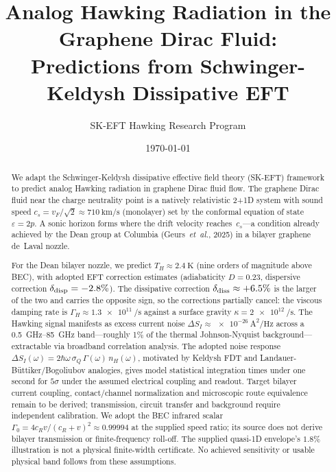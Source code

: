 \documentclass[aps,prd,twocolumn,showpacs,superscriptaddress,nofootinbib]{revtex4-2}
\begin{document}
\title{Analog Hawking Radiation in the Graphene Dirac Fluid:\\
Predictions from Schwinger-Keldysh Dissipative EFT}

\author{SK-EFT Hawking Research Program}

\date{\today}

\begin{abstract}
We adapt the Schwinger-Keldysh dissipative effective field theory (SK-EFT)
framework to predict analog Hawking radiation in graphene Dirac fluid flow.
The graphene Dirac fluid near the charge neutrality point is a natively
relativistic 2+1D system with sound speed $c_s = v_F/\sqrt{2} \approx
\SI{710}{\kilo\meter/\second}$ (monolayer) set by the conformal equation
of state $\varepsilon = 2p$. A sonic horizon forms where the drift velocity
reaches~$c_s$---a condition already achieved by the Dean group at Columbia
(Geurs~\textit{et~al.}, 2025) in a bilayer graphene de~Laval nozzle.

For the Dean bilayer nozzle, we predict $T_H \approx \SI{2.4}{\kelvin}$
(nine orders of magnitude above BEC), with adopted EFT correction estimates
(adiabaticity $D = 0.23$, dispersive correction $\delta_{\rm disp} = -2.8\%$).
The dissipative correction $\delta_{\rm diss} \approx +6.5\%$ is the larger
of the two and carries the opposite sign, so the corrections partially
cancel: the viscous damping rate is
$\Gamma_H \approx \SI{1.3e11}{\per\second}$ against a surface gravity
$\kappa = \SI{2e12}{\per\second}$. The Hawking
signal manifests as excess current noise $\Delta S_I \approx
\SI{e-26}{\ampere\squared/\hertz}$ across a \SIrange{0.5}{85}{\giga\hertz}
band---roughly 1\% of the thermal Johnson-Nyquist background---extractable
via broadband correlation analysis. The adopted noise response
$\Delta S_I(\omega) = 2\hbar\omega\,\sigma_Q\,\Gamma(\omega)\,n_H(\omega)$,
motivated by Keldysh FDT and Landauer-B\"uttiker/Bogoliubov analogies,
gives model statistical integration times under one second for $5\sigma$
under the assumed electrical coupling and readout. Target bilayer current
coupling, contact/channel normalization and microscopic route equivalence
remain to be derived; transmission, circuit transfer and background require
independent calibration. We adopt the BEC infrared scalar
$\Gamma_0=4c_Rv/(c_R+v)^2\approx0.99994$ at the supplied speed ratio;
its source does not derive bilayer transmission or finite-frequency
roll-off. The supplied quasi-1D envelope's $1.8\%$ illustration is not a
physical finite-width certificate. No achieved sensitivity or usable
physical band follows from these assumptions.


\end{abstract}
\end{document}
